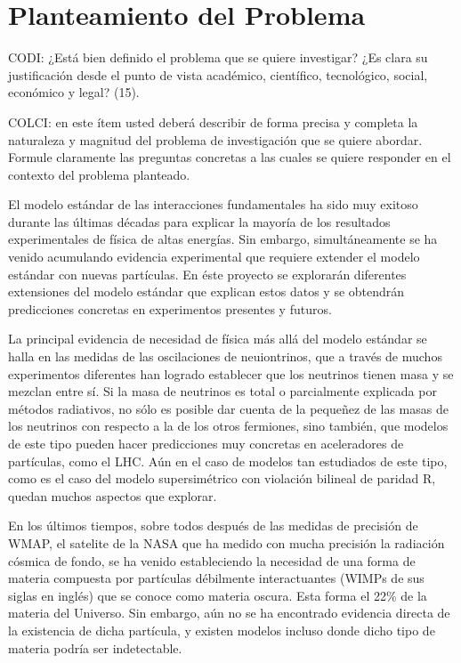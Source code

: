 \section{Planteamiento del Problema }
\begin{instrucciones}
  CODI: ¿Está bien definido el problema que se quiere investigar? ¿Es clara su justificación desde el punto de vista académico, científico, tecnológico, social, económico y legal? (15).

  COLCI: en este ítem usted deberá describir de forma precisa y completa la
  naturaleza y magnitud del problema de investigación que se quiere
  abordar. Formule claramente las preguntas concretas a las cuales se
  quiere responder en el contexto del problema planteado.
\end{instrucciones}
El modelo estándar de las interacciones fundamentales ha sido muy exitoso durante las últimas décadas para explicar la mayoría de los resultados experimentales de física de altas energías. Sin embargo, simultáneamente se ha venido acumulando evidencia experimental que requiere extender el modelo estándar con nuevas partículas.  En éste proyecto se explorarán diferentes extensiones del modelo estándar que explican estos datos y se obtendrán predicciones concretas en experimentos presentes y futuros.

La principal evidencia de necesidad de física más allá del modelo estándar se halla en las medidas de las oscilaciones de neuiontrinos, que a través de muchos experimentos diferentes han logrado establecer que los neutrinos tienen masa y se mezclan entre sí. Si la masa de neutrinos es total o parcialmente explicada por métodos radiativos, no sólo es posible dar cuenta de la pequeñez de las masas de los neutrinos con respecto a la de los otros fermiones, sino también, que modelos de este tipo pueden hacer predicciones muy concretas en aceleradores de partículas, como el LHC. Aún en el caso de modelos tan estudiados de este tipo, como es el caso del modelo supersimétrico con violación bilineal de paridad R, quedan muchos aspectos que explorar. 

En los últimos tiempos, sobre todos después de las medidas de precisión de WMAP, el satelite de la NASA que ha medido con mucha precisión la radiación cósmica de fondo, se ha venido estableciendo la necesidad de una forma de materia compuesta por partículas  débilmente interactuantes (WIMPs de sus siglas en inglés) que se conoce como materia oscura. Esta forma el 22\% de la materia del Universo. Sin embargo, aún no se ha encontrado evidencia directa de la existencia de dicha partícula, y existen modelos incluso donde dicho tipo de materia podría ser indetectable.

